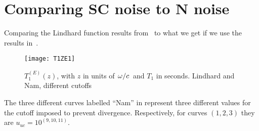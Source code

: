 \documentclass[11pt]{article}
\begin{document}
	\graphicspath{{figures/}}

	\section{Comparing SC noise to N noise} \label{sec:intro}

	Comparing the Lindhard function results from~\cite{SolyomV3} to what we get if we use the results in~\cite{Nam1967}.

	\begin{figure}[htp]
		\centering
		\texttt{[image: T1ZE1]}
		\caption{$T_{1}^{(E)}(z)$, with $z$ in units of $\flatfrac{\omega}{c}$ and $T_1$ in seconds.
		Lindhard and Nam, different cutoffs}\label{fig:t1ez}
	\end{figure}

	The three different curves labelled ``Nam'' in  represent three different values for the cutoff imposed to prevent divergence.
	Respectively, for curves $(1, 2, 3)$ they are $u_{uc} = 10^{(9, 10, 11)}$.

	\newpage
	\listoftodos
	\newpage
	\printbibliography
\end{document}
